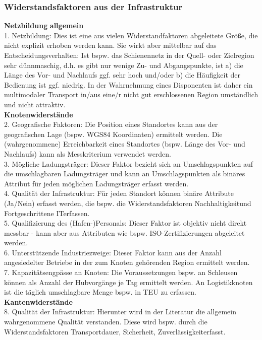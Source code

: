 % 
\subsubsection{Widerstandsfaktoren aus der Infrastruktur}
\label{_Toc366766113}
\label{_Toc366775307}
\textbf{Netzbildung }\textbf{allgemein}~\\
1. Netzbildung: Dies ist eine aus vielen Widerstandfaktoren abgeleitete Größe, die nicht explizit erhoben werden kann. Sie wirkt aber mittelbar auf das Entscheidungsverhalten: Ist bspw. das Schienennetz in der Quell- oder Zielregion sehr dünnmaschig, d.h. es gibt nur wenige Zu- und Abgangspunkte, ist a) die Länge des Vor- und Nachlaufs ggf. sehr hoch und/oder b) die Häufigkeit der Bedienung ist ggf. niedrig. In der Wahrnehmung eines Disponenten ist daher ein multimodaler Transport in/aus eine/r nicht gut erschlossenen Region umständlich und nicht attraktiv.~\\
\textbf{Knotenwiderstände}~\\
2. Geografische Faktoren: Die Position eines Standortes kann aus der geografischen Lage (bspw. WGS84 Koordinaten) ermittelt werden. Die (wahrgenommene) Erreichbarkeit  eines Standortes (bspw. Länge des Vor- und Nachlaufs) kann als Messkriterium verwendet werden.~\\
3. Mögliche Ladungsträger: Dieser Faktor bezieht sich an Umschlagspunkten auf die umschlagbaren Ladungsträger und kann an Umschlagspunkten als binäres Attribut für jeden möglichen Ladungsträger erfasst werden.~\\
4. Qualität der Infrastruktur: Für jeden Standort können binäre Attribute (Ja/Nein) erfasst werden, die bspw. die Widerstandsfaktoren \glqq Nachhaltigkeit\grqq  und \glqq Fortgeschrittene IT\grqq  erfassen.~\\
5. Qualifizierung des (Hafen-)Personals: Dieser Faktor ist objektiv nicht direkt messbar - kann aber aus Attributen wie bspw. ISO-Zertifizierungen abgeleitet werden. ~\\
6. Unterstützende Industriezweige: Dieser Faktor kann aus der Anzahl angesiedelter Betriebe in der zum Knoten gehörenden Region ermittelt werden. ~\\
7. Kapazitätsengpässe an Knoten: Die Voraussetzungen bspw. an Schleusen können als Anzahl der Hubvorgänge je Tag ermittelt werden. An Logistikknoten ist die täglich umschlagbare Menge bspw. in TEU zu erfassen.~\\
\textbf{Kantenwiderstände}~\\
8. Qualität der Infrastruktur: Hierunter wird in der Literatur die allgemein wahrgenommene Qualität verstanden. Diese wird bspw. durch die Widerstandsfaktoren \glqq Transportdauer\grqq , \glqq Sicherheit\grqq , \glqq Zuverlässigkeit\grqq  erfasst.~\\
